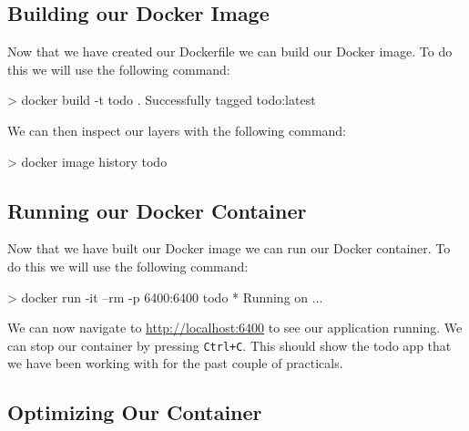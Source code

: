 \documentclass{csse4400}
\begin{document}
\subsection{Building our Docker Image}

Now that we have created our Dockerfile we can build our Docker image. To do this we will use the following command:

\begin{code}[language=bash,numbers=none]{}
> docker build -t todo .
Successfully tagged todo:latest
\end{code}

We can then inspect our layers with the following command:

\begin{code}[language=bash,numbers=none]{}
> docker image history todo
\end{code}


\subsection{Running our Docker Container}

Now that we have built our Docker image we can run our Docker container. To do this we will use the following command:

\begin{code}[language=bash,numbers=none]{}
> docker run -it --rm -p 6400:6400 todo
* Running on ...
\end{code}

We can now navigate to \url{http://localhost:6400} to see our application running.
We can stop our container by pressing \texttt{Ctrl+C}.
This should show the todo app that we have been working with for the past couple of practicals.



\subsection{Optimizing Our Container}
\end{document}
